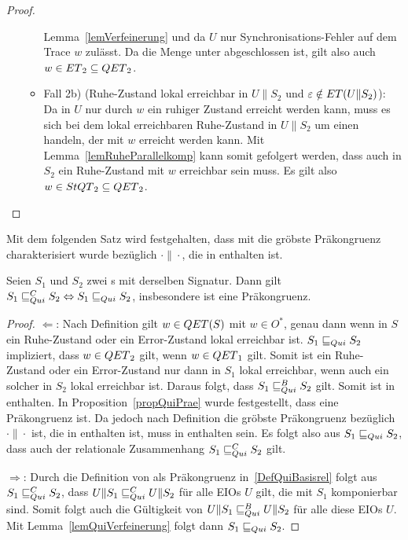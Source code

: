 \begin{proof}
\begin{itemize}
\begin{itemize}
          Lemma~\ref{lemVerfeinerung} und da $U$ nur Synchronisations-Fehler
          auf dem Trace $w$ zulässt. Da die Menge \ET{} unter \cont{}
          abgeschlossen ist, gilt also auch $w\in ET{}_2\subseteq QET{}_2$.
        \item Fall 2b) (Ruhe-Zustand lokal erreichbar in $U\|S_2$ und
          $\varepsilon\notin ET{}(U\|S_2)$): Da in $U$
          nur durch $w$ ein ruhiger Zustand erreicht werden kann, muss es sich
          bei dem lokal erreichbaren Ruhe-Zustand in $U\|S_2$ um einen handeln,
          der mit $w$ erreicht werden kann. Mit Lemma~\ref{lemRuheParallelkomp}
          kann somit gefolgert werden, dass auch in $S_2$ ein Ruhe-Zustand mit
          $w$ erreichbar sein muss. Es gilt also $w\in StQT{}_2\subseteq
          QET{}_2$.
      \end{itemize}
  \end{itemize}
\end{proof}

Mit dem folgenden Satz wird festgehalten, dass mit \QRel{} die gröbste
Präkongruenz charakterisiert wurde bezüglich $\cdot\|\cdot$, die in \QBRel{}
enthalten ist.

\begin{satz}
\label{satzQuiFullAbst}
  Seien $S_1$ und $S_2$ zwei \EIO{}s mit derselben Signatur. Dann gilt
  $S_1\sqsubseteq _{Qui}^C S_2\Leftrightarrow S_1\sqsubseteq _{Qui} S_2$, insbesondere ist \QRel{} eine
  Präkongruenz.
\end{satz}

\begin{proof}
  \glqq{}$\Leftarrow$\grqq{}: Nach Definition gilt $w\in QET{}(S)$ mit $w\in
  O^*$, genau dann wenn in $S$ ein Ruhe-Zustand oder ein Error-Zustand lokal
  erreichbar ist. $S_1\sqsubseteq _{Qui} S_2$ impliziert, dass $w\in QET{}_2$ gilt, wenn
  $w\in QET{}_1$ gilt. Somit ist ein Ruhe-Zustand oder ein Error-Zustand nur dann in
  $S_1$ lokal erreichbar, wenn auch ein solcher in $S_2$ lokal erreichbar ist.
  Daraus folgt, dass $S_1\sqsubseteq _{Qui}^B S_2$ gilt. Somit ist \QRel{} in \QBRel{}
  enthalten. In Proposition~\ref{propQuiPrae} wurde festgestellt, dass \QRel{}
  eine Präkongruenz ist. Da jedoch \QCRel{} nach Definition die gröbste
  Präkongruenz bezüglich $\cdot\|\cdot$ ist, die in \QBRel{} enthalten ist,
  muss \QRel{} in \QCRel{} enthalten sein. Es folgt also aus $S_1\sqsubseteq _{Qui} S_2$,
  dass auch der relationale Zusammenhang $S_1\sqsubseteq _{Qui}^C S_2$ gilt.

  \glqq{}$\Rightarrow$\grqq{}: Durch die Definition von \QCRel{} als
  Präkongruenz in~\ref{DefQuiBasisrel} folgt aus $S_1\sqsubseteq _{Qui}^C{} S_2$, dass
  $U\|S_1\sqsubseteq _{Qui}^C U\|S_2$ für alle EIOs $U$ gilt, die mit $S_1$ komponierbar sind.
  Somit folgt auch die Gültigkeit von $U\|S_1\sqsubseteq _{Qui}^B U\|S_2$ für alle diese EIOs
  $U$. Mit Lemma~\ref{lemQuiVerfeinerung} folgt dann $S_1\sqsubseteq _{Qui}{} S_2$.
\end{proof}

